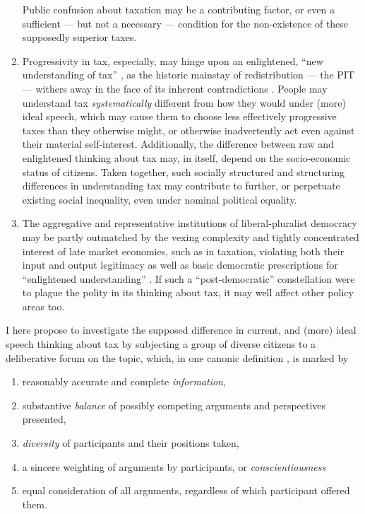 \begin{enumerate}
		Public confusion about taxation may be a contributing factor, or even a sufficient --- but not a necessary --- condition for the non-existence of these supposedly superior taxes. 
	\item
		Progressivity in tax, especially, may hinge upon an enlightened, ``new understanding of tax'' \citep{McCaffery2005}, as the historic mainstay of redistribution --- the \gls{PIT} --- withers away in the face of its inherent contradictions \citep{McCafferyHines2010}.
		People may understand tax \emph{systematically} different from how they would under (more) ideal speech, which may cause them to choose less effectively progressive taxes than they otherwise might, or otherwise inadvertently act even against their material self-interest.
		Additionally, the difference between raw and enlightened thinking about tax may, in itself, depend on the socio-economic status of citizens.
		Taken together, such socially structured and structuring differences in understanding tax may contribute to further, or perpetuate existing social inequality, even under nominal political equality.
	\item
		The aggregative and representative institutions of liberal-pluralist democracy may be partly outmatched by the vexing complexity \citep{Merton-1968-aa} and tightly concentrated interest \citep{Olson-1971-aa} of late market economies, such as in taxation, violating both their input and output legitimacy \citep{Scharpf1997} as well as basic democratic prescriptions for ``enlightened understanding'' \citep{Dahl-1989-aa}.
		If such a ``post-democratic'' constellation \citep{Crouch2004} were to plague the polity in its thinking about tax, it may well affect other policy areas too.
\end{enumerate}

I here propose to investigate the supposed difference in current, and (more) ideal speech thinking about tax by subjecting a group of diverse citizens to a deliberative forum on the topic, which, in one canonic definition \cite[K1799]{Fishkin2009}, is marked by 
\begin{enumerate}
	\item reasonably accurate and complete \emph{information},
	\item substantive \emph{balance} of possibly competing arguments and perspectives presented,
	\item \emph{diversity} of participants and their positions taken,
	\item a sincere weighting of arguments by participants, or \emph{conscientiousness}
	\item equal consideration of all arguments, regardless of which participant offered them.
\end{enumerate}

